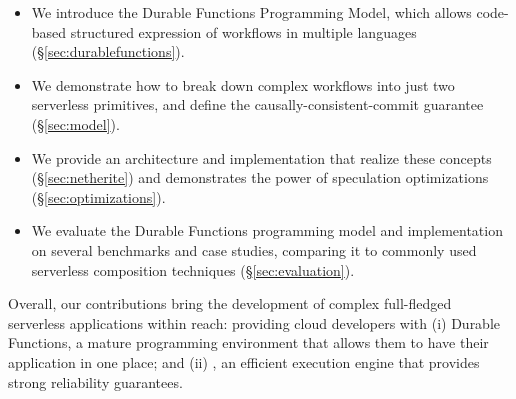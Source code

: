 \begin{itemize}
\item We introduce the Durable Functions Programming Model, which allows code-based structured expression of workflows in multiple languages (\S\ref{sec:durablefunctions}).
\item We demonstrate how to break down complex workflows into just two serverless primitives, and define the causally-consistent-commit guarantee (\S\ref{sec:model}).
\item We provide an architecture and implementation that realize these concepts (\S\ref{sec:netherite}) and demonstrates the power of speculation optimizations (\S\ref{sec:optimizations}).
\item We evaluate the Durable Functions programming model and \sys implementation on several benchmarks and case studies, comparing it to commonly used serverless composition techniques (\S\ref{sec:evaluation}).
\end{itemize}
%
%
Overall, our contributions bring the development of complex full-fledged serverless applications within reach: providing cloud developers with (i) Durable Functions, a mature programming environment that allows them to have their application in one place; and (ii) \sys, an efficient execution engine that provides strong reliability guarantees.
